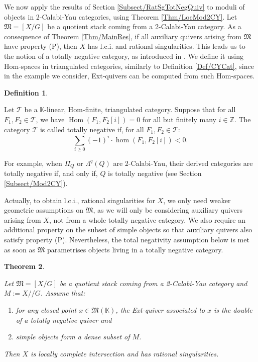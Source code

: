 \documentclass[11pt,english]{article}
\numberwithin{equation}{section}
\numberwithin{figure}{section}
\theoremstyle{definition}
\newtheorem{df}{Definition}[subsection]
\theoremstyle{plain}
\newtheorem{thm}[df]{Theorem}
\theoremstyle{remark}
\DeclareMathOperator{\Hom}{Hom}
\newcommand\KK{\mathbb{K}}
\newcommand\git{/\!\!/}
\begin{document}
We now apply the results of Section \ref{Subsect/RatSgTotNegQuiv}
to moduli of objects in 2-Calabi-Yau categories, using Theorem \ref{Thm/LocMod2CY}.
Let $\mathfrak{M}=[X/G]$ be a quotient stack coming from a 2-Calabi-Yau
category. As a consequence of Theorem \ref{Thm/MainRes}, if all auxiliary
quivers arising from $\mathfrak{M}$ have property (P), then $X$
has l.c.i. and rational singularities. This leads us to the notion
of a totally negative category, as introduced in \cite{DHSM22}. We
define it using Hom-spaces in triangulated categories, similarly to
Definition \ref{Def/CYCat}, since in the example we consider, Ext-quivers
can be computed from such Hom-spaces.

\begin{df} \label{Def/TotNegCat}

Let $\mathcal{T}$ be a $\KK$-linear, Hom-finite, triangulated category.
Suppose that for all $F_{1},F_{2}\in\mathcal{T}$, we have $\Hom(F_{1},F_{2}[i])=0$
for all but finitely many $i\in\mathbb{Z}$. The category $\mathcal{T}$
is called totally negative if, for all $F_{1},F_{2}\in\mathcal{T}$:\[
\sum_{i\geq0}(-1)^i\cdot\hom(F_1,F_2[i])<0.
\]\end{df}

For example, when $\Pi_{Q}$ or $\Lambda^{q}(Q)$ are 2-Calabi-Yau,
their derived categories are totally negative if, and only if, $Q$
is totally negative (see Section \ref{Subsect/Mod2CY}).

Actually, to obtain l.c.i., rational singularities for $X$, we only
need weaker geometric assumptions on $\mathfrak{M}$, as we will only
be considering auxiliary quivers arising from $X$, not from a whole
totally negative category. We also require an additional property
on the subset of simple objects so that auxiliary quivers also satisfy
property (P). Nevertheless, the total negativity assumption below
is met as soon as $\mathfrak{M}$ parametrises objects living in a
totally negative category.

\begin{thm} \label{Thm/RatSgTotNeg2CY}

Let $\mathfrak{M}=[X/G]$ be a quotient stack coming from a 2-Calabi-Yau
category and $M:=X\git G$. Assume that:
\begin{enumerate}
\item for any closed point $x\in\mathfrak{M}(\KK)$, the Ext-quiver associated
to $x$ is the double of a totally negative quiver and
\item simple objects form a dense subset of $M$.
\end{enumerate}
Then $X$ is locally complete intersection and has rational singularities.

\end{thm}
\end{document}
